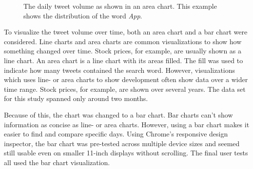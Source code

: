 \begin{figure}[h!tb]
    \caption{The daily tweet volume as shown in an area chart. This example shows the distribution of the word \emph{App}.}
    \label{fig:volume_areachart}
\end{figure}

To visualize the tweet volume over time, both an area chart and a bar chart were considered. Line charts and area charts are common visualizations to show how something changed over time. Stock prices, for example, are usually shown as a line chart. An area chart is a line chart with its areas filled. The fill was used to indicate how many tweets contained the search word. However, visualizations which uses line- or area charts to show development often show data over a wider time range. Stock prices, for example, are shown over several years. The data set for this study spanned only around two months.

Because of this, the chart was changed to a bar chart. Bar charts can't show information as concise as line- or area charts. However, using a bar chart makes it easier to find and compare specific days. Using Chrome's responsive design inspector, the bar chart was pre-tested across multiple device sizes and seemed still usable even on smaller 11-inch displays without scrolling. The final user tests all used the bar chart visualization.

